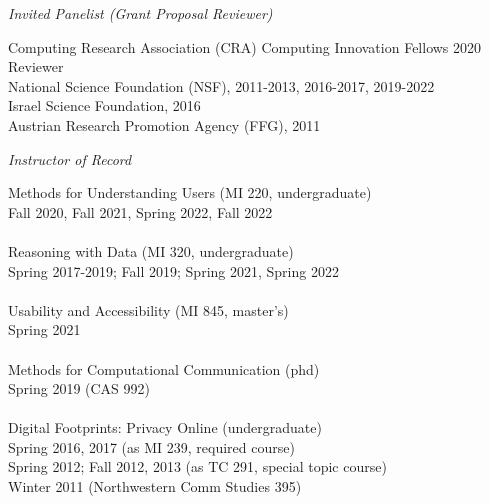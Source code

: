 \documentclass[9pt]{extarticle}
\makeatletter
\renewcommand{\section}{%
  \@startsection{section}{1}{0em}{\baselineskip}{3pt}{\large\bfseries\textsc}}
\makeatother
\begin{document}
\emph{Invited Panelist (Grant Proposal Reviewer)} \\
\vspace{1pt}

Computing Research Association (CRA) Computing Innovation Fellows 2020 Reviewer \\
National Science Foundation (NSF), 2011-2013, 2016-2017, 2019-2022 \\
Israel Science Foundation, 2016 \\
Austrian Research Promotion Agency (FFG), 2011


\section{Teaching}

\emph{Instructor of Record} \\[1pt]
\begin{tabbing}
Methods for Understanding Users (MI 220, undergraduate) \\
\hspace{0.5cm} Fall 2020, Fall 2021, Spring 2022, Fall 2022 \\\\

Reasoning with Data (MI 320, undergraduate) \\
\hspace{0.5cm} Spring 2017-2019; Fall 2019; Spring 2021, Spring 2022 \\\\

Usability and Accessibility (MI 845, master's) \\
\hspace{0.5cm} Spring 2021 \\\\

Methods for Computational Communication (phd) \\
\hspace{0.5cm} Spring 2019 (CAS 992) \\\\

Digital Footprints: Privacy Online (undergraduate) \\ 
\hspace{0.5cm} Spring 2016, 2017 (as MI 239, required course) \\
\hspace{0.5cm} Spring 2012; Fall 2012, 2013 (as TC 291, special topic course) \\ 
\hspace{0.5cm} Winter 2011 (Northwestern Comm Studies 395) \\\\
\end{tabbing}
\end{document}
